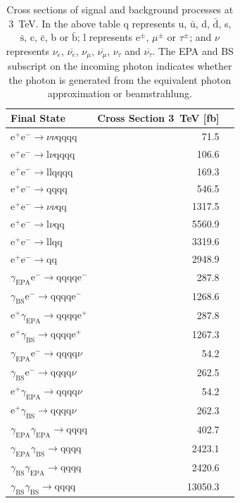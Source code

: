\begin{table}[h!]
\centering
\begin{tabular}{ l r r }
\hline
Final State & Cross Section 3~TeV [fb]  \\ 
\hline
$\text{e}^{+}\text{e}^{-} \rightarrow \nu{\nu}\text{qqqq}$ & 71.5 \\
$\text{e}^{+}\text{e}^{-} \rightarrow \text{l}\nu\text{qqqq}$ & 106.6 \\
$\text{e}^{+}\text{e}^{-} \rightarrow \text{llqqqq}$ & 169.3 \\
$\text{e}^{+}\text{e}^{-} \rightarrow \text{qqqq}$ & 546.5 \\
$\text{e}^{+}\text{e}^{-} \rightarrow \nu{\nu}\text{qq}$ & 1317.5 \\
$\text{e}^{+}\text{e}^{-} \rightarrow \text{l}\nu\text{qq}$ & 5560.9 \\
$\text{e}^{+}\text{e}^{-} \rightarrow \text{llqq}$ & 3319.6 \\
$\text{e}^{+}\text{e}^{-} \rightarrow \text{qq}$ & 2948.9 \\
$\gamma_{\text{EPA}}\text{e}^{-} \rightarrow \text{qqqq}\text{e}^{-}$ & 287.8 \\
$\gamma_{\text{BS}}\text{e}^{-} \rightarrow \text{qqqq}\text{e}^{-}$ & 1268.6 \\
$\text{e}^{+}\gamma_{\text{EPA}} \rightarrow \text{qqqq}\text{e}^{+}$ & 287.8 \\
$\text{e}^{+}\gamma_{\text{BS}} \rightarrow \text{qqqq}\text{e}^{+}$ & 1267.3 \\
$\gamma_{\text{EPA}}\text{e}^{-} \rightarrow \text{qqqq}\nu$ & 54.2 \\
$\gamma_{\text{BS}}\text{e}^{-} \rightarrow \text{qqqq}\nu$ & 262.5 \\
$\text{e}^{+}\gamma_{\text{EPA}} \rightarrow \text{qqqq}\nu$ & 54.2 \\
$\text{e}^{+}\gamma_{\text{BS}} \rightarrow \text{qqqq}\nu$ & 262.3 \\
$\gamma_{\text{EPA}}\gamma_{\text{EPA}} \rightarrow \text{qqqq}$ & 402.7 \\
$\gamma_{\text{EPA}}\gamma_{\text{BS}} \rightarrow \text{qqqq}$ & 2423.1 \\
$\gamma_{\text{BS}}\gamma_{\text{EPA}} \rightarrow \text{qqqq}$ & 2420.6 \\
$\gamma_{\text{BS}}\gamma_{\text{BS}} \rightarrow \text{qqqq}$ & 13050.3 \\
\hline
\end{tabular}
\caption[Cross sections of signal and background processes at 3~TeV]{Cross sections of signal and background processes at 3~TeV.  In the above table q represents u, $\bar{\text{u}}$, d, $\bar{\text{d}}$, s, $\bar{\text{s}}$, c, $\bar{\text{c}}$, b or $\bar{\text{b}}$;  l represents $\text{e}^{\pm}$, $\mu^{\pm}$ or $\tau^{\pm}$; and $\nu$ represents $\nu_{e}$, $\overline{\nu_{e}}$, $\nu_{\mu}$, $\overline{\nu_{\mu}}$, $\nu_{\tau}$ and $\overline{\nu_{\tau}}$.  The EPA and BS subscript on the incoming photon indicates whether the photon is generated from the equivalent photon approximation or beamstrahlung.}
\label{table:crosssection3000GeV}
\end{table}

